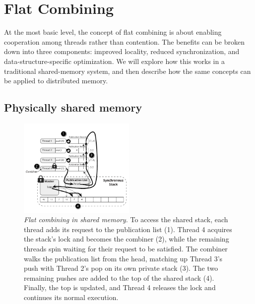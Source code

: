 \section{Flat Combining}

At the most basic level, the concept of flat combining is about enabling cooperation among threads rather than contention. The benefits can be broken down into three components: improved locality, reduced synchronization, and data-structure-specific optimization. We will explore how this works in a traditional shared-memory system, and then describe how the same concepts can be applied to distributed memory.


\subsection{Physically shared memory}

\begin{figure}[t]
  \centering
  \includegraphics[width=0.5\textwidth]{figs/fc_shared_mem.pdf}
  \caption{\emph{Flat combining in shared memory.}
    To access the shared stack, each thread adds its request to the publication list (1). Thread 4 acquires the stack's lock and becomes the combiner (2), while the remaining threads spin waiting for their request to be satisfied. The combiner walks the publication list from the head, matching up Thread 3's push with Thread 2's pop on its own private stack (3). The two remaining pushes are added to the top of the shared stack (4). Finally, the top is updated, and Thread 4 releases the lock and continues its normal execution.
  }
  \label{fig:fc_shared_mem}
\end{figure}

